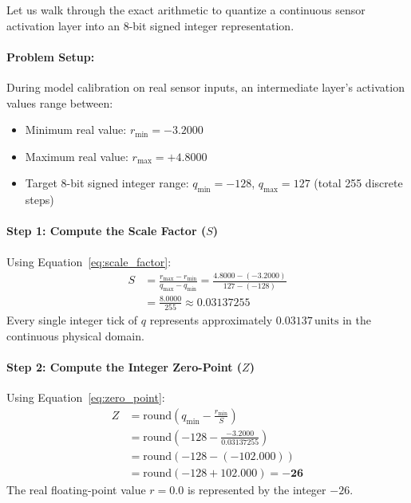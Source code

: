 \begin{example}
Let us walk through the exact arithmetic to quantize a continuous sensor activation layer into an 8-bit signed integer representation.

\paragraph{Problem Setup:}
During model calibration on real sensor inputs, an intermediate layer's activation values range between:
\begin{itemize}
    \item Minimum real value: $r_{\min} = -3.2000$
    \item Maximum real value: $r_{\max} = +4.8000$
    \item Target 8-bit signed integer range: $q_{\min} = -128$, $q_{\max} = 127$ (total 255 discrete steps)
\end{itemize}

\paragraph{Step 1: Compute the Scale Factor ($S$)}
Using Equation~\eqref{eq:scale_factor}:
\begin{align*}
S &= \frac{r_{\max} - r_{\min}}{q_{\max} - q_{\min}} = \frac{4.8000 - (-3.2000)}{127 - (-128)}\\
  &= \frac{8.0000}{255} \approx \mathbf{0.03137255}
\end{align*}
Every single integer tick of $q$ represents approximately $0.03137\,\text{units}$ in the continuous physical domain.

\paragraph{Step 2: Compute the Integer Zero-Point ($Z$)}
Using Equation~\eqref{eq:zero_point}:
\begin{align*}
Z &= \text{round}\left( q_{\min} - \frac{r_{\min}}{S} \right)\\
  &= \text{round}\left( -128 - \frac{-3.2000}{0.03137255} \right)\\
  &= \text{round}\left( -128 - (-102.000) \right)\\
  &= \text{round}(-128 + 102.000) = \mathbf{-26}
\end{align*}
The real floating-point value $r = 0.0$ is represented by the integer $-26$.


\end{example}
